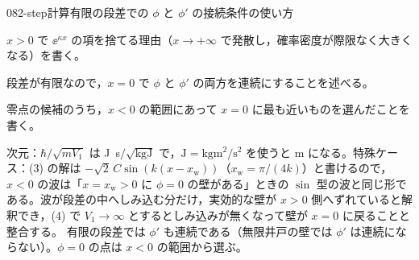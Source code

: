 \documentclass[uplatex,dvipdfmx,a4paper,11pt]{jsarticle}
\begin{document}
\begin{mondai}{082-step}{計算}{有限の段差での $\phi$ と $\phi'$ の接続条件の使い方}
\begin{tadashii}
\begin{ronten}
  \item {} $x>0$ で $\ee^{\kappa x}$ の項を捨てる理由（$x\to+\infty$ で発散し，確率密度が際限なく大きくなる）を書く。
  \item {} 段差が有限なので，$x=0$ で $\phi$ と $\phi'$ の両方を連続にすることを述べる。
  \item {} 零点の候補のうち，$x<0$ の範囲にあって $x=0$ に最も近いものを選んだことを書く。
\end{ronten}
\kenzan 次元：$\hbar/\sqrt{mV_{1}}$ は \unit{\joule\second}$/\sqrt{\unit{\kilogram\joule}}$ で，$\unit{\joule}=\unit{\kilogram\metre\squared\per\second\squared}$ を使うと \unit{\metre} になる。特殊ケース：(3) の解は $-\sqrt{2}\,C\sin(k(x-x_{\mathrm{w}}))$（$x_{\mathrm{w}}=\pi/(4k)$）と書けるので，$x<0$ の波は「$x=x_{\mathrm{w}}>0$ に $\phi=0$ の壁がある」ときの $\sin$ 型の波と同じ形である。波が段差の中へしみ込む分だけ，実効的な壁が $x>0$ 側へずれていると解釈でき，(4) で $V_{1}\to\infty$ とするとしみ込みが無くなって壁が $x=0$ に戻ることと整合する。
\tsumazuki 有限の段差では $\phi'$ も連続である（無限井戸の壁では $\phi'$ は連続にならない）。$\phi=0$ の点は $x<0$ の範囲から選ぶ。
\end{tadashii}
\end{mondai}
\end{document}
